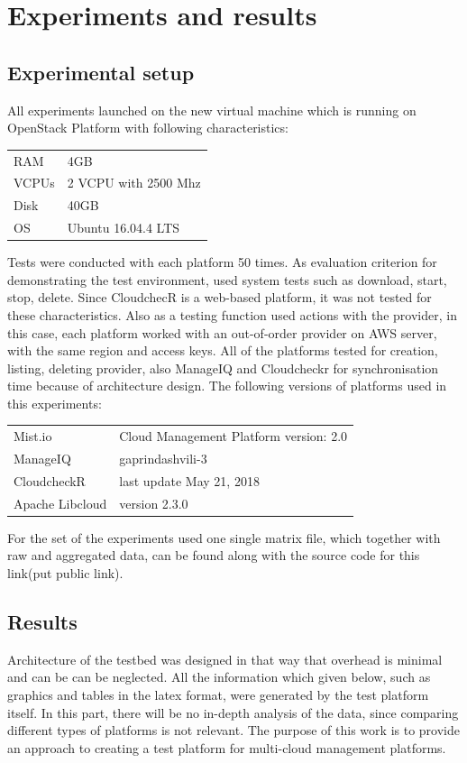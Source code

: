 \section{Experiments and results}
\subsection{Experimental setup}
All experiments  launched  on the new virtual machine which is running on OpenStack\cite{openstack} Platform with following characteristics: 
\begin{table}[ht]
\begin{tabular}{ll}
RAM & 4GB \\
VCPUs & 2 VCPU with 2500 Mhz \\
Disk & 40GB \\
OS &  Ubuntu 16.04.4 LTS\\
\end{tabular}
\end{table}

Tests were conducted with each platform 50 times. As evaluation criterion for demonstrating the test environment, used system tests such as download, start, stop, delete. Since CloudchecR is a web-based platform, it was not tested for these characteristics. Also as a testing function used actions with the provider, in this case, each platform worked with an out-of-order provider on AWS server, with the same region and access keys. All of the platforms tested for creation, listing, deleting provider, also ManageIQ and Cloudcheckr for synchronisation time because of architecture design. The following versions of  platforms used in this experiments:

\begin{table}[ht]
\begin{tabular}{ll}
Mist.io  & Cloud Management Platform version: 2.0 \\
ManageIQ & gaprindashvili-3 \\
CloudcheckR & last update May 21, 2018 \\
Apache Libcloud & version 2.3.0\\
\end{tabular}
\end{table}

For the set of the experiments used one single matrix file, which together with raw and aggregated data, can be found along with the source code for this link(put public link).

\subsection{Results}
Architecture of the testbed was designed in that way that overhead is minimal and can be can be neglected.
All the information which given below, such as graphics and tables in the latex format, were generated by the test platform itself. In this part, there will be no in-depth analysis of the data, since comparing different types of platforms is not relevant. The purpose of this work is to provide an approach to creating a test platform for multi-cloud management platforms.

